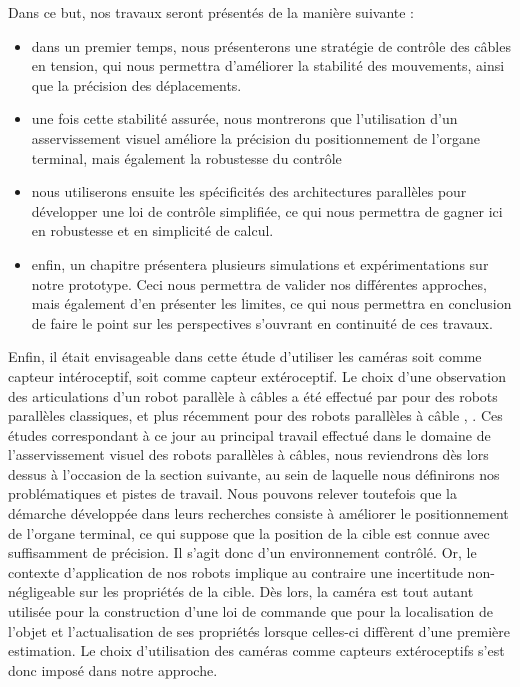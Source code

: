 Dans ce but, nos travaux seront pr\'esent\'es de la mani\`ere suivante : 
\begin{itemize}
 \item dans un premier temps, nous pr\'esenterons une strat\'egie de contr\^ole
des c\^ables en tension, qui nous permettra d'am\'eliorer la stabilit\'e des
mouvements, ainsi que la pr\'ecision des d\'eplacements.
 \item une fois cette stabilit\'e assur\'ee, nous montrerons que l'utilisation
d'un asservissement visuel am\'eliore la pr\'ecision du positionnement de
l'organe terminal, mais \'egalement la robustesse du contr\^ole
 \item nous utiliserons ensuite les sp\'ecificit\'es des architectures
parall\`eles pour d\'evelopper une loi de contr\^ole simplifi\'ee, ce qui nous
permettra de gagner ici en robustesse et en simplicit\'e de calcul.
 \item enfin, un chapitre pr\'esentera plusieurs simulations et
exp\'erimentations sur notre prototype. Ceci nous permettra de valider nos
diff\'erentes approches, mais \'egalement d'en pr\'esenter les limites, ce qui
nous permettra en conclusion de faire le point sur les perspectives s'ouvrant
en continuit\'e de ces travaux.
\end{itemize}




Enfin, il était envisageable dans cette étude d'utiliser les caméras soit comme 
capteur intéroceptif, soit comme capteur extéroceptif. Le choix d'une 
observation des articulations d'un robot parallèle à câbles a été effectué par 
\cite{andreff2007} pour des robots parallèles classiques, et plus récemment 
pour des robots parallèles à câble \cite{dallej2011}, \cite{dallej2012}. Ces 
études 
correspondant à ce jour au principal travail effectué dans le domaine de 
l'asservissement visuel des robots parallèles à câbles, nous reviendrons dès 
lors dessus à l'occasion de la section suivante, au sein de laquelle nous 
définirons nos problématiques et pistes de travail. Nous pouvons relever 
toutefois que la démarche développée dans leurs recherches consiste à améliorer 
le positionnement de l'organe terminal, ce qui suppose que la position de la 
cible est connue avec suffisamment de précision. Il s'agit donc d'un 
environnement contrôlé. Or, le contexte d'application de nos robots implique au 
contraire une incertitude non-négligeable sur les propriétés de la cible. Dès 
lors, la caméra est tout autant utilisée pour la construction d'une loi de 
commande que pour la localisation de l'objet et l'actualisation de ses 
propriétés lorsque celles-ci diffèrent d'une première estimation. Le choix 
d'utilisation des caméras comme capteurs extéroceptifs s'est donc imposé dans 
notre approche.





